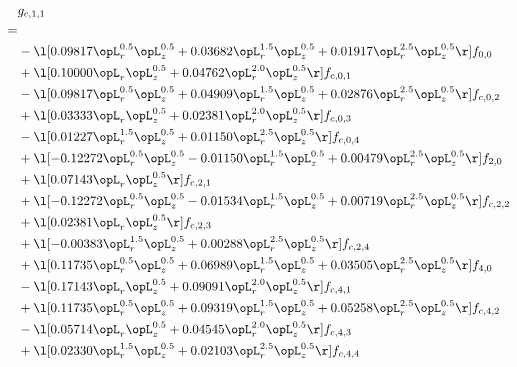 \begin{alignat}{2} 
\label{eq:g_11_0} 
& g_{c,1,1} \nonumber \\ 
 = \\ 
& - \l[  0.09817 \opL_r^{0.5} \opL_z^{0.5} +  0.03682 \opL_r^{1.5} \opL_z^{0.5} +  0.01917 \opL_r^{2.5} \opL_z^{0.5}  \r] f_{0,0} \nonumber \\ 
& + \l[  0.10000 \opL_r \opL_z^{0.5} +  0.04762 \opL_r^{2.0} \opL_z^{0.5}  \r] f_{c,0,1} \nonumber \\ 
& - \l[  0.09817 \opL_r^{0.5} \opL_z^{0.5} +  0.04909 \opL_r^{1.5} \opL_z^{0.5} +  0.02876 \opL_r^{2.5} \opL_z^{0.5}  \r] f_{c,0,2} \nonumber \\ 
& + \l[  0.03333 \opL_r \opL_z^{0.5} +  0.02381 \opL_r^{2.0} \opL_z^{0.5}  \r] f_{c,0,3} \nonumber \\ 
& - \l[  0.01227 \opL_r^{1.5} \opL_z^{0.5} +  0.01150 \opL_r^{2.5} \opL_z^{0.5}  \r] f_{c,0,4} \nonumber \\ 
& + \l[  -0.12272 \opL_r^{0.5} \opL_z^{0.5}   -0.01150 \opL_r^{1.5} \opL_z^{0.5} +  0.00479 \opL_r^{2.5} \opL_z^{0.5}  \r] f_{2,0} \nonumber \\ 
& + \l[  0.07143 \opL_r \opL_z^{0.5}  \r] f_{c,2,1} \nonumber \\ 
& + \l[  -0.12272 \opL_r^{0.5} \opL_z^{0.5}   -0.01534 \opL_r^{1.5} \opL_z^{0.5} +  0.00719 \opL_r^{2.5} \opL_z^{0.5}  \r] f_{c,2,2} \nonumber \\ 
& + \l[  0.02381 \opL_r \opL_z^{0.5}  \r] f_{c,2,3} \nonumber \\ 
& + \l[  -0.00383 \opL_r^{1.5} \opL_z^{0.5} +  0.00288 \opL_r^{2.5} \opL_z^{0.5}  \r] f_{c,2,4} \nonumber \\ 
& + \l[  0.11735 \opL_r^{0.5} \opL_z^{0.5} +  0.06989 \opL_r^{1.5} \opL_z^{0.5} +  0.03505 \opL_r^{2.5} \opL_z^{0.5}  \r] f_{4,0} \nonumber \\ 
& - \l[  0.17143 \opL_r \opL_z^{0.5} +  0.09091 \opL_r^{2.0} \opL_z^{0.5}  \r] f_{c,4,1} \nonumber \\ 
& + \l[  0.11735 \opL_r^{0.5} \opL_z^{0.5} +  0.09319 \opL_r^{1.5} \opL_z^{0.5} +  0.05258 \opL_r^{2.5} \opL_z^{0.5}  \r] f_{c,4,2} \nonumber \\ 
& - \l[  0.05714 \opL_r \opL_z^{0.5} +  0.04545 \opL_r^{2.0} \opL_z^{0.5}  \r] f_{c,4,3} \nonumber \\ 
& + \l[  0.02330 \opL_r^{1.5} \opL_z^{0.5} +  0.02103 \opL_r^{2.5} \opL_z^{0.5}  \r] f_{c,4,4} \nonumber \\ 
\end{alignat} 


